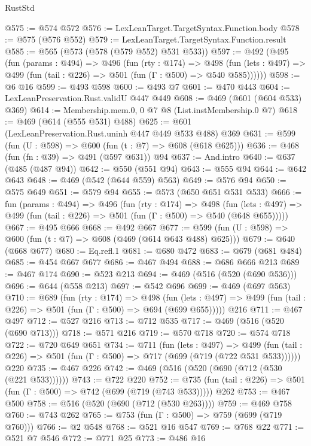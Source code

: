 \begin{lexlean}{RustStd}
\begin{coremodule}
{\begin{coremodule}
{{{{{{@575 := @574 @572
@576 := LexLeanTarget.TargetSyntax.Function.body
@578 := @575 (@576 @552)
@579 := LexLeanTarget.TargetSyntax.Function.result
@585 := @565 (@573 (@578 (@579 @552) @531 @533))
@597 := @492
    (@495
      (fun (params : @494) =>
      @496
        (fun (rty : @174) =>
        @498
          (fun (lets : @497) => @499 (fun (tail : @226) => @501 (fun (Γ : @500) => @540 @585))))))
@598 := @6 @16
@599 := @493 @598
@600 := @493 @7
@601 := @470 @443
@604 := LexLeanPreservation.Rust.validU @447 @449
@608 := @469 (@601 (@604 @533) @369)
@614 := Membership.mem.{0, 0} @7 @8 (List.instMembership.{0} @7)
@618 := @469 (@614 (@555 @531) @488)
@625 := @601 (LexLeanPreservation.Rust.uninh @447 @449 @533 @488) @369
@631 := @599 (fun (U : @598) => @600 (fun (t : @7) => @608 (@618 @625)))
@636 := @468 (fun (fn : @39) => @491 (@597 @631)) @94
@637 := And.intro
@640 := @637 (@485 (@487 @94))
@642 := @550 (@551 @94)
@643 := @555 @94
@644 := @642 @643
@648 := @469 (@542 (@644 @559) @563)
@649 := @576 @94
@650 := @575 @649
@651 := @579 @94
@655 := @573 (@650 @651 @531 @533)
@666 := fun (params : @494) =>
  @496
    (fun (rty : @174) =>
    @498
      (fun (lets : @497) => @499 (fun (tail : @226) => @501 (fun (Γ : @500) => @540 (@648 @655)))))
@667 := @495 @666
@668 := @492 @667
@677 := @599 (fun (U : @598) => @600 (fun (t : @7) => @608 (@469 (@614 @643 @488) @625)))
@679 := @640 (@668 @677)
@680 := Eq.refl.{1}
@681 := @680 @472
@683 := @679 (@681 @484)
@685 := @454 @667 @677
@686 := @467 @494
@688 := @686 @666 @213
@689 := @467 @174
@690 := @523 @213
@694 := @469 (@516 (@520 (@690 @536)))
@696 := @644 (@558 @213)
@697 := @542 @696
@699 := @469 (@697 @563)
@710 := @689
    (fun (rty : @174) =>
    @498
      (fun (lets : @497) => @499 (fun (tail : @226) => @501 (fun (Γ : @500) => @694 (@699 @655)))))
    @216
@711 := @467 @497
@712 := @527 @216
@713 := @712 @535
@717 := @469 (@516 (@520 (@690 @713)))
@718 := @571 @216
@719 := @570 @718
@720 := @574 @718
@722 := @720 @649 @651
@734 := @711
    (fun (lets : @497) =>
    @499 (fun (tail : @226) => @501 (fun (Γ : @500) => @717 (@699 (@719 (@722 @531 @533))))))
    @220
@735 := @467 @226
@742 := @469 (@516 (@520 (@690 (@712 (@530 (@221 @533))))))
@743 := @722 @220
@752 := @735 (fun (tail : @226) => @501 (fun (Γ : @500) => @742 (@699 (@719 (@743 @533))))) @262
@753 := @467 @500
@758 := @516 (@520 (@690 (@712 (@530 @263))))
@759 := @469 @758
@760 := @743 @262
@765 := @753 (fun (Γ : @500) => @759 (@699 (@719 @760)))
@766 := @2 @548
@768 := @521 @16 @547
@769 := @768 @22
@771 := @521 @7 @546
@772 := @771 @25
@773 := @486 @16
}}}}}}
\end{coremodule}}
\end{coremodule}
\end{lexlean}

